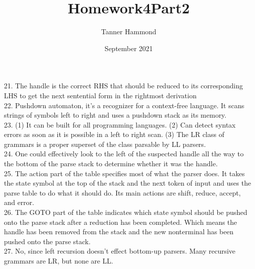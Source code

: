 \documentclass{article}
\title{Homework4Part2}
\author{Tanner Hammond }
\date{September 2021}
\begin{document}
\maketitle

21. The handle is the correct RHS that should be reduced to its corresponding LHS to get the next sentential form in the rightmost derivation\\
22. Pushdown automaton, it's a recognizer for a context-free language. It scans strings of symbols left to right and uses a pushdown stack as its memory.\\
23. (1) It can be built for all programming languages. (2) Can detect syntax errors as soon as it is possible in a left to right scan. (3) The LR class of grammars is a proper superset of the class parsable by LL parsers.\\
24. One could effectively look to the left of the suspected handle all the way to the bottom of the parse stack to determine whether it was the handle.\\
25. The action part of the table specifies most of what the parser does. It takes the state symbol at the top of the stack and the next token of input and uses the parse table to do what it should do. Its main actions are shift, reduce, accept, and error.\\
26. The GOTO part of the table indicates which state symbol should be pushed onto the parse stack after a reduction has been completed. Which means the handle has been removed from the stack and the new nonterminal has been pushed onto the parse stack. \\
27. No, since left recursion doesn't effect bottom-up parsers. Many recursive grammars are LR, but none are LL.
\end{document}

